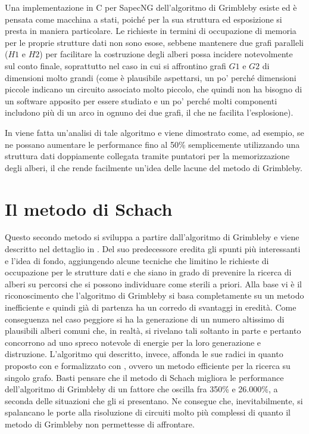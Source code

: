 Una implementazione in C per SapecNG dell'algoritmo di Grimbleby esiste ed è pensata come macchina a stati, poiché per la sua struttura ed esposizione si presta in maniera particolare. Le richieste in termini di occupazione di memoria per le proprie strutture dati non sono esose, sebbene mantenere due grafi paralleli ($H1$ e $H2$) per facilitare la costruzione degli alberi possa incidere notevolmente sul conto finale, soprattutto nel caso in cui si affrontino grafi $G1$ e $G2$ di dimensioni molto grandi (come è plausibile aspettarsi, un po' perché dimensioni piccole indicano un circuito associato molto piccolo, che quindi non ha bisogno di un software apposito per essere studiato e un po' perché molti componenti includono più di un arco in ognuno dei due grafi, il che ne facilita l'esplosione).

In \cite{Schach} viene fatta un'analisi di tale algoritmo e viene dimostrato come, ad esempio, se ne possano aumentare le performance fino al 50\% semplicemente utilizzando una struttura dati doppiamente collegata tramite puntatori per la memorizzazione degli alberi, il che rende facilmente un'idea delle lacune del metodo di Grimbleby.


\section{Il metodo di Schach}

Questo secondo metodo si sviluppa a partire dall'algoritmo di Grimbleby e viene descritto nel dettaglio in \cite{MRT}. Del suo predecessore eredita gli spunti più interessanti e l'idea di fondo, aggiungendo alcune tecniche che limitino le richieste di occupazione per le strutture dati e che siano in grado di prevenire la ricerca di alberi su percorsi che si possono individuare come sterili a priori. Alla base vi è il riconoscimento che l'algoritmo di Grimbleby si basa completamente su un metodo inefficiente \cite{GraphTheory} e quindi già di partenza ha un corredo di svantaggi in eredità. Come conseguenza nel caso peggiore si ha la generazione di un numero altissimo di plausibili alberi comuni che, in realtà, si rivelano tali soltanto in parte e pertanto concorrono ad uno spreco notevole di energie per la loro generazione e distruzione. L'algoritmo qui descritto, invece, affonda le sue radici in quanto proposto con \cite{Minty} e formalizzato con \cite{ReadTarjan}, ovvero un metodo efficiente per la ricerca su singolo grafo. Basti pensare che il metodo di Schach migliora le performance dell'algoritmo di Grimbleby di un fattore che oscilla fra 350\% e 26.000\%, a seconda delle situazioni che gli si presentano. Ne consegue che, inevitabilmente, si spalancano le porte alla risoluzione di circuiti molto più complessi di quanto il metodo di Grimbleby non permettesse di affrontare.

